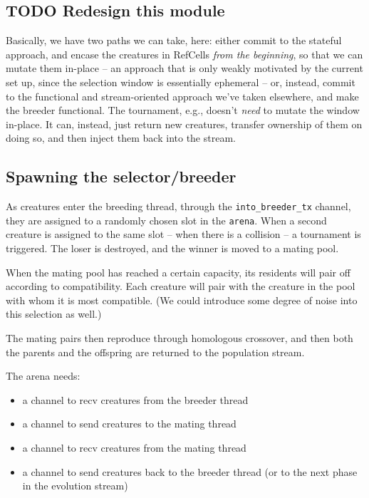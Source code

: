 \documentclass[11pt]{article}
\begin{document}
\subsection{{\bfseries\sffamily TODO} Redesign this module}
\label{sec:org8201ab9}

Basically, we have two paths we can take, here: either commit to the stateful approach, and
encase the creatures in RefCells \emph{from the beginning}, so that we can mutate them in-place
-- an approach that is only weakly motivated by the current set up, since the selection window
is essentially ephemeral -- or, instead, commit to the functional and stream-oriented approach
we've taken elsewhere, and make the breeder functional. The tournament, e.g., doesn't \emph{need} to
mutate the window in-place. It can, instead, just return new creatures, transfer ownership of 
them on doing so, and then inject them back into the stream. 


\subsection{Spawning the selector/breeder}
\label{sec:orgc6cd854}

As creatures enter the breeding thread, through the \texttt{into\_breeder\_tx}
channel, they are assigned to a randomly chosen slot in the \texttt{arena}. 
When a second creature is assigned to the same slot -- when there is
a collision -- a tournament is triggered. The loser is destroyed, and
the winner is moved to a mating pool. 

When the mating pool has reached a certain capacity, its residents will
pair off according to compatibility. Each creature will pair with the
creature in the pool with whom it is most compatible. (We could introduce
some degree of noise into this selection as well.) 

The mating pairs then reproduce through homologous crossover, and then
both the parents and the offspring are returned to the population stream.

The arena needs:
\begin{itemize}
\item a channel to recv creatures from the breeder thread
\item a channel to send creatures to the mating thread
\item a channel to recv creatures from the mating thread
\item a channel to send creatures back to the breeder thread
(or to the next phase in the evolution stream)
\end{itemize}
\end{document}
